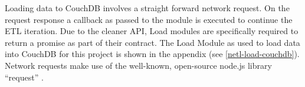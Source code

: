 Loading data to CouchDB involves a straight forward network request. On the request response a callback as passed to the module is executed to continue the ETL iteration. Due to the cleaner API, Load modules are specifically required to return a promise as part of their contract. The Load Module as used to load data into CouchDB for this project is shown in the appendix (see \ref{netl-load-couchdb}). Network requests make use of the well-known, open-source node.js library ``request'' \cite{request-lib}.